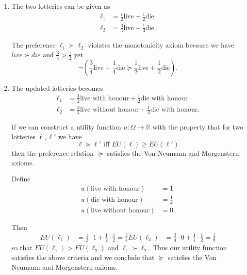 \documentclass[a4paper]{article}
\begin{document}
  \begin{exercise}{9}
    \begin{enumerate}[label=(\alph*)]
      \item The two lotteries can be given as
        \begin{align*}
          \ell_1 &= \frac{1}{2}\text{live} + \frac{1}{2}\text{die} \\
          \ell_2 &= \frac{3}{4}\text{live} + \frac{1}{4}\text{die}
        .\end{align*}

        The preference $ \ell_1 \succ \ell_2 $ violates the monotonicity axiom because we have $ live \succ die $ and $ \frac{3}{4} > \frac{1}{2} $ yet
        \begin{equation*}
         \lnot \left( \frac{3}{4}\text{live} + \frac{1}{4}\text{die} \succeq \frac{1}{2}\text{live} + \frac{1}{2}\text{die} \right)
        .\end{equation*}

      \item The updated lotteries becomes
        \begin{align*}
          \ell_1 &= \frac{1}{2}\text{live with honour} + \frac{1}{2}\text{die with honour} \\
          \ell_2 &= \frac{3}{4}\text{live without honour} + \frac{1}{4}\text{die with honour}
        .\end{align*}

        If we can construct a utility function $ u: \Omega \to \mathbb{R} $ with the property that for two lotteries $ \ell, \ell' $ we have
        \begin{equation*}
          \ell \succeq \ell'\text{ iff } EU(\ell) \geq EU(\ell')
        \end{equation*}
        then the preference relation $ \succeq $ satisfies the Von Neumann and Morgenstern axioms.

        Define
        \begin{align*}
          u(\text{live with honour}) &= 1 \\
          u(\text{die with honour}) &= \frac{1}{2} \\
          u(\text{live without honour}) &= 0
        .\end{align*}

        Then
        \begin{align*}
          EU(\ell_1) &= \frac{1}{2}\cdot 1 + \frac{1}{2}\cdot\frac{1}{2} = \frac{3}{4}
          EU(\ell_2) &= \frac{3}{4}\cdot 0 + \frac{1}{4}\cdot\frac{1}{2} = \frac{1}{8}
        \end{align*}
        so that $ EU(\ell_1) > EU(\ell_2) $ and $ \ell_1 \succ \ell_2 $. Thus our utility function satisfies the above criteria and we conclude that $ \succeq $ satisfies the Von Neumann and Morgenstern axioms.


\end{enumerate}
\end{exercise}
\end{document}
